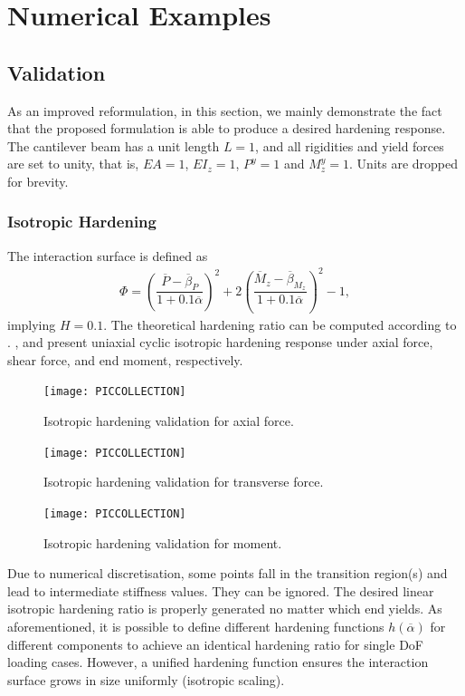 \section{Numerical Examples}
\subsection{Validation}
As an improved reformulation, in this section, we mainly demonstrate the fact that the proposed formulation is able to produce a desired hardening response.
The cantilever beam has a unit length $L=1$, and all rigidities and yield forces are set to unity, that is, $EA=1$, $EI_z=1$, $P^y=1$ and $M^y_z=1$.
Units are dropped for brevity.
\subsubsection{Isotropic Hardening}
The interaction surface is defined as
\begin{gather}
\Phi=\left(\dfrac{\overline{P}-\overline{\beta}_P}{1+0.1\overline{\alpha}}\right)^2+2\left(\dfrac{\overline{M}_z-\overline{\beta}_{M_z}}{1+0.1\overline{\alpha}}\right)^2-1,
\end{gather}
implying $H=0.1$.
The theoretical hardening ratio can be computed according to .
,  and  present uniaxial cyclic isotropic hardening response under axial force, shear force, and end moment, respectively.
\begin{figure}[htb]
\centering\footnotesize
\texttt{[image: PICCOLLECTION]}
\caption{Isotropic hardening validation for axial force.}\label{fig:iso_hardening_a}
\end{figure}
\begin{figure}[htb]
\centering\footnotesize
\texttt{[image: PICCOLLECTION]}
\caption{Isotropic hardening validation for transverse force.}\label{fig:iso_hardening_b}
\end{figure}
\begin{figure}[htb]
\centering\footnotesize
\texttt{[image: PICCOLLECTION]}
\caption{Isotropic hardening validation for moment.}\label{fig:iso_hardening_c}
\end{figure}
Due to numerical discretisation, some points fall in the transition region(s) and lead to intermediate stiffness values.
They can be ignored.
The desired linear isotropic hardening ratio is properly generated no matter which end yields.
As aforementioned, it is possible to define different hardening functions $h\left(\overline{\alpha}\right)$ for different components to achieve an identical hardening ratio for single DoF loading cases.
However, a unified hardening function ensures the interaction surface grows in size uniformly (isotropic scaling).
